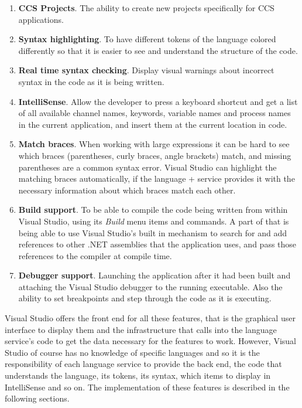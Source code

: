 	\begin{enumerate}
		\item \textbf{CCS Projects}. The ability to create new projects 
		specifically for CCS applications.

		\item \textbf{Syntax highlighting}. To have different tokens of the 
		language colored differently so that it is easier to see and understand 
		the structure of the code.
		
		\item \textbf{Real time syntax checking}. Display visual warnings about 
		incorrect syntax in the code as it is being written. 
	
		\item \textbf{IntelliSense}. Allow the developer to press a keyboard 
		shortcut and get a list of all available channel names, keywords, variable 
		names and process names in the current application, and insert them at the 
		current location in code. 
		
		\item \textbf{Match braces}. When working with large expressions it 
		can be hard to see which braces (parentheses, curly braces, angle 
		brackets) match, and missing parentheses are a common syntax error. Visual 
		Studio can highlight the matching braces automatically, if the language +
		service provides it with the necessary information about which braces 
		match each other.
		
		\item \textbf{Build support}. To be able to compile the code being written 
		from within Visual Studio, using its \textit{Build} menu items and 
		commands. A part of that is being able to use Visual Studio's built in 
		mechanism to search for and add references to other .NET assemblies that 
		the application uses, and pass those references to the compiler at compile 
		time.
		
		\item \textbf{Debugger support}. Launching the application after it had 
		been built and attaching the Visual Studio debugger to the running 
		executable. Also the ability to set breakpoints and step through the code 
		as it is executing.
		
	\end{enumerate}
	
	Visual Studio offers the front end for all these features, that is the 
	graphical user interface to display them and the infrastructure that calls 
	into the language service's code to get the data necessary for the features 
	to work. However, Visual Studio of course has no knowledge of specific 
	languages and so it is the responsibility of each language service to 
	provide the back end, the code that understands the language, its tokens, 
	its syntax, which items to display in IntelliSense and so on. The 
	implementation of these features is described in the following sections.
	
